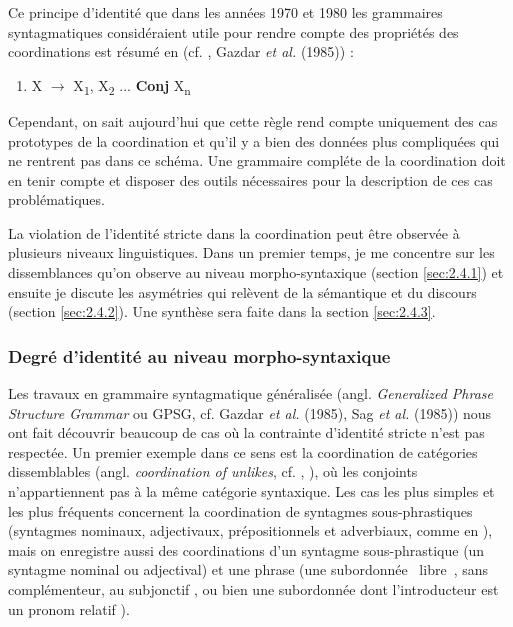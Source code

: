 Ce principe d'identité que dans les années 1970 et 1980 les grammaires syntagmatiques considéraient utile pour rendre compte des propriétés des coordinations est résumé en  (cf. \citet{Jackendoff1977}, Gazdar \textit{et al.} (1985)) :


\begin{enumerate}
\item \label{bkm:Ref268609534}X $\rightarrow $ X\textsubscript{1}, X\textsubscript{2} ... \textbf{Conj} X\textsubscript{n}


\end{enumerate}
Cependant, on sait aujourd'hui que cette règle rend compte uniquement des cas prototypes de la coordination et qu'il y a bien des données plus compliquées qui ne rentrent pas dans ce schéma. Une grammaire compléte de la coordination doit en tenir compte et disposer des outils nécessaires pour la description de ces cas problématiques. 

La violation de l'identité stricte dans la coordination peut être observée à plusieurs niveaux linguistiques. Dans un premier temps, je me concentre sur les dissemblances qu'on observe au niveau morpho-syntaxique (section \ref{sec:2.4.1}) et ensuite je discute les asymétries qui relèvent de la sémantique et du discours (section \ref{sec:2.4.2}). Une synthèse sera faite dans la section \ref{sec:2.4.3}.  

\subsubsection{Degré d'identité au niveau morpho-syntaxique} 
\label{bkm:Ref300780566}Les travaux en grammaire syntagmatique généralisée (angl. \textit{Generalized Phrase Structure Grammar} ou GPSG, cf. Gazdar \textit{et al.} (1985), Sag \textit{et al.} (1985)) nous ont fait découvrir beaucoup de cas où la contrainte d'identité stricte n'est pas respectée. Un premier exemple dans ce sens est la coordination de catégories dissemblables (angl. \textit{coordination of unlikes}, cf. \citet{Yatabe2004}, \citet{Sag2005}), où les conjoints n'appartiennent pas à la même catégorie syntaxique. Les cas les plus simples et les plus fréquents concernent la coordination de syntagmes sous-phrastiques (syntagmes nominaux, adjectivaux, prépositionnels et adverbiaux, comme en ), mais on enregistre aussi des coordinations d'un syntagme sous-phrastique (un syntagme nominal ou adjectival) et une phrase (une subordonnée {\guillemotleft}~libre~{\guillemotright}, sans complémenteur, au subjonctif , ou bien une subordonnée dont l'introducteur est un pronom relatif ).


